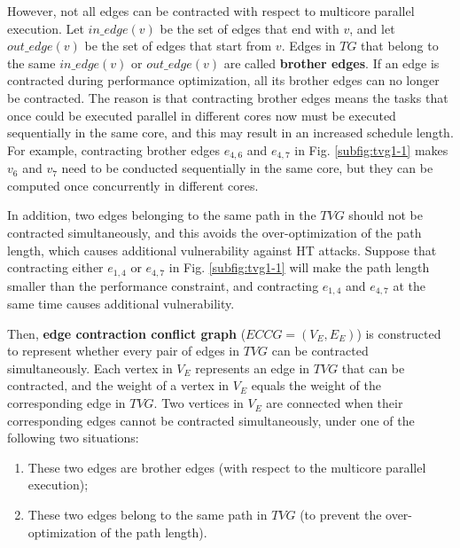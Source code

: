 \documentclass[10pt,journal, compsoc]{IEEEtran}
\begin{document}


However, not all edges can be contracted with respect to multicore parallel execution. Let $in\_edge(v)$ be the set of edges that end with $v$, and let $out\_edge(v)$ be the set of edges that start from $v$. Edges in $TG$ that belong to the same $in\_edge(v)$ or $out\_edge(v)$ are called \textbf{brother edges}. If an edge is contracted during performance optimization, all its brother edges can no longer be contracted. The reason is that contracting brother edges means the tasks that once could be executed parallel in different cores now must be executed sequentially in the same core, and this may result in an increased schedule length. For example, contracting brother edges $e_{4,6}$ and $e_{4,7}$ in Fig. \ref{subfig:tvg1-1} makes $v_6$ and $v_7$ need to be conducted sequentially in the same core, but they can be computed once concurrently in different cores.

In addition, two edges belonging to the same path in the $TVG$ should not be contracted simultaneously, and this avoids the over-optimization of the path length, which causes additional vulnerability against HT attacks. Suppose that contracting either $e_{1,4}$ or $e_{4,7}$ in Fig. \ref{subfig:tvg1-1} will make the path length smaller than the performance constraint, and contracting $e_{1,4}$ and $e_{4,7}$ at the same time causes additional vulnerability.

Then, \textbf{edge contraction conflict graph} ($ECCG=(V_E,E_E)$) is constructed to represent whether every pair of edges in $TVG$ can be contracted simultaneously. Each vertex in $V_E$ represents an edge in $TVG$ that can be contracted, and the weight of a vertex in $V_E$ equals the weight of the corresponding edge in $TVG$. Two vertices in $V_E$ are connected when their corresponding edges cannot be contracted simultaneously, under one of the following two situations:
\begin{enumerate}
\item These two edges are brother edges (with respect to the multicore parallel execution);
\item These two edges belong to the same path in $TVG$ (to prevent the over-optimization of the path length).
\end{enumerate}
\end{document}
